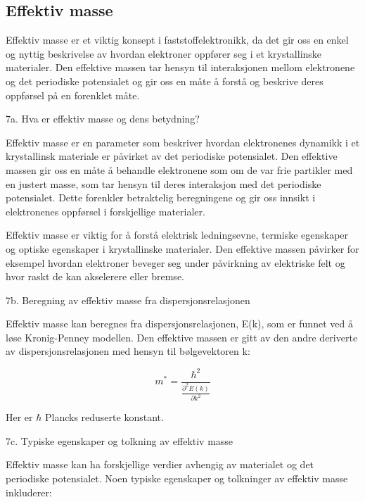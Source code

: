 \subsection*{Effektiv masse}

Effektiv masse er et viktig konsept i faststoffelektronikk, da det gir oss en enkel og nyttig beskrivelse av hvordan elektroner oppfører seg i et krystallinske materialer. Den effektive massen tar hensyn til interaksjonen mellom elektronene og det periodiske potensialet og gir oss en måte å forstå og beskrive deres oppførsel på en forenklet måte.

7a. Hva er effektiv masse og dens betydning?

Effektiv masse er en parameter som beskriver hvordan elektronenes dynamikk i et krystallinsk materiale er påvirket av det periodiske potensialet. Den effektive massen gir oss en måte å behandle elektronene som om de var frie partikler med en justert masse, som tar hensyn til deres interaksjon med det periodiske potensialet. Dette forenkler betraktelig beregningene og gir oss innsikt i elektronenes oppførsel i forskjellige materialer.

Effektiv masse er viktig for å forstå elektrisk ledningsevne, termiske egenskaper og optiske egenskaper i krystallinske materialer. Den effektive massen påvirker for eksempel hvordan elektroner beveger seg under påvirkning av elektriske felt og hvor raskt de kan akselerere eller bremse.

7b. Beregning av effektiv masse fra dispersjonsrelasjonen

Effektiv masse kan beregnes fra dispersjonsrelasjonen, E(k), som er funnet ved å løse Kronig-Penney modellen. Den effektive massen er gitt av den andre deriverte av dispersjonsrelasjonen med hensyn til bølgevektoren k:

\begin{equation*}
m^* = \frac{\hbar^2}{\frac{\partial^2 E(k)}{\partial k^2}}
\end{equation*}

Her er $\hbar$ Plancks reduserte konstant.

7c. Typiske egenskaper og tolkning av effektiv masse

Effektiv masse kan ha forskjellige verdier avhengig av materialet og det periodiske potensialet. Noen typiske egenskaper og tolkninger av effektiv masse inkluderer:

